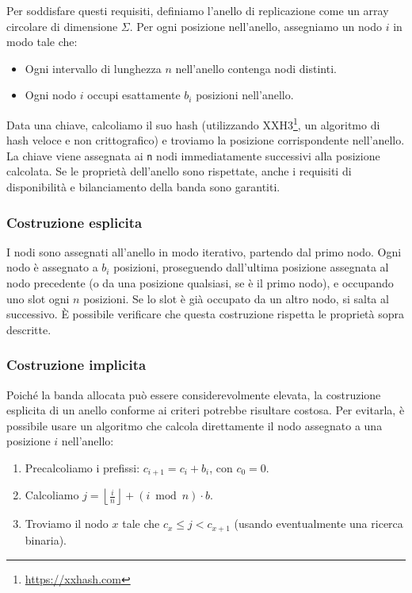 Per soddisfare questi requisiti, definiamo l'anello di replicazione come un array circolare di dimensione $\Sigma$.
Per ogni posizione nell'anello, assegniamo un nodo $i$ in modo tale che:

\begin{itemize}
    \item Ogni intervallo di lunghezza $n$ nell'anello contenga nodi distinti.
    \item Ogni nodo $i$ occupi esattamente $b_i$ posizioni nell'anello.
\end{itemize}

Data una chiave, calcoliamo il suo hash (utilizzando XXH3\footnote{\url{https://xxhash.com}}, un algoritmo di hash veloce e non crittografico) e troviamo la posizione corrispondente nell'anello.
La chiave viene assegnata ai \texttt{n} nodi immediatamente successivi alla posizione calcolata.
Se le proprietà dell'anello sono rispettate, anche i requisiti di disponibilità e bilanciamento della banda sono garantiti.

\subsubsection{Costruzione esplicita}
\label{subsubsec:costruzione-esplicita}

I nodi sono assegnati all'anello in modo iterativo, partendo dal primo nodo.
Ogni nodo è assegnato a $b_i$ posizioni, proseguendo dall'ultima posizione assegnata al nodo precedente (o da una posizione qualsiasi, se è il primo nodo), e occupando uno slot ogni $n$ posizioni.
Se lo slot è già occupato da un altro nodo, si salta al successivo.
È possibile verificare che questa costruzione rispetta le proprietà sopra descritte.

\subsubsection{Costruzione implicita}
\label{subsubsec:costruzione-implicita}

Poiché la banda allocata può essere considerevolmente elevata, la costruzione esplicita di un anello conforme ai criteri potrebbe risultare costosa.
Per evitarla, è possibile usare un algoritmo che calcola direttamente il nodo assegnato a una posizione $i$ nell'anello:

\begin{enumerate}
    \item Precalcoliamo i prefissi: $c_{i+1} = c_i + b_i$, con $c_0 = 0$.
    \item Calcoliamo $j = \left\lfloor \frac{i}{n} \right\rfloor + (i \bmod n) \cdot b$.
    \item Troviamo il nodo $x$ tale che $c_x \leq j < c_{x+1}$ (usando eventualmente una ricerca binaria).
\end{enumerate}


